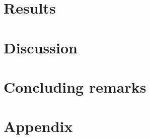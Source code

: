 \documentclass[twocolumn,english,notitlepage]{article}
\begin{document}
\section{Results}


\section{Discussion}


\section{Concluding remarks} 



\renewcommand{\theequation}{\thesection.\arabic{equation}}
\newpage
\section{Appendix}
\begin{appendices}
     
\end{appendices}

\newpage

\end{document}
